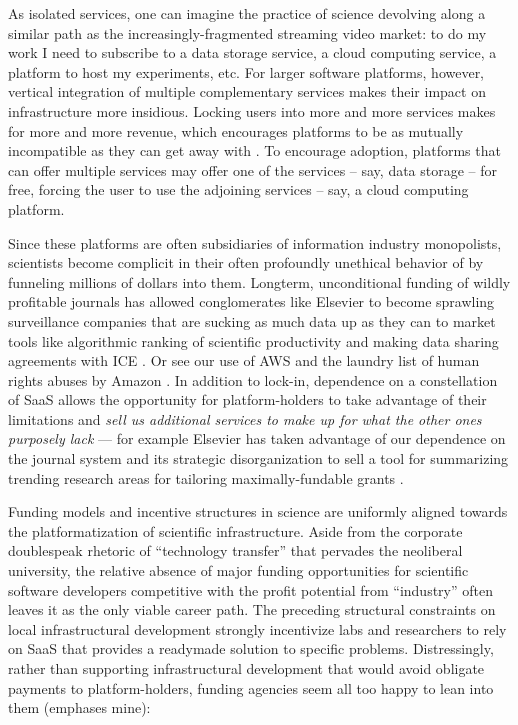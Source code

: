 \documentclass[notoc]{tufte-book}
\begin{document}
As isolated services, one can imagine the practice of science devolving
along a similar path as the increasingly-fragmented streaming video
market: to do my work I need to subscribe to a data storage service, a
cloud computing service, a platform to host my experiments, etc. For
larger software platforms, however, vertical integration of multiple
complementary services makes their impact on infrastructure more
insidious. Locking users into more and more services makes for more and
more revenue, which encourages platforms to be as mutually incompatible
as they can get away with \citep{macinnesCompatibilityStandardsMonopoly2005} . To encourage adoption,
platforms that can offer multiple services may offer one of the services
-- say, data storage -- for free, forcing the user to use the adjoining
services -- say, a cloud computing platform.

Since these platforms are often subsidiaries of information industry
monopolists, scientists become complicit in their often profoundly
unethical behavior of by funneling millions of dollars into them.
Longterm, unconditional funding of wildly profitable journals has
allowed conglomerates like Elsevier to become sprawling surveillance
companies \citep{RELXAnnualReport2020}  that are sucking as much
data up as they can to market tools like algorithmic ranking of
scientific productivity \citep{brembsAlgorithmicEmploymentDecisions2021}  and making data sharing
agreements with ICE \citep{biddleLexisNexisProvideGiant2021} . Or
see our use of AWS and the laundry list of human rights abuses by Amazon
\citep{CriticismAmazon2021} . In addition to lock-in, dependence
on a constellation of SaaS allows the opportunity for platform-holders
to take advantage of their limitations and \emph{sell us additional
services to make up for what the other ones purposely lack} --- for
example Elsevier has taken advantage of our dependence on the journal
system and its strategic disorganization to sell a tool for summarizing
trending research areas for tailoring maximally-fundable grants \citep{elsevierTopicProminenceSciencea} .

Funding models and incentive structures in science are uniformly aligned
towards the platformatization of scientific infrastructure. Aside from
the corporate doublespeak rhetoric of ``technology transfer'' that
pervades the neoliberal university, the relative absence of major
funding opportunities for scientific software developers competitive
with the profit potential from ``industry'' often leaves it as the only
viable career path. The preceding structural constraints on local
infrastructural development strongly incentivize labs and researchers to
rely on SaaS that provides a readymade solution to specific problems.
Distressingly, rather than supporting infrastructural development that
would avoid obligate payments to platform-holders, funding agencies seem
all too happy to lean into them (emphases mine):
\end{document}
